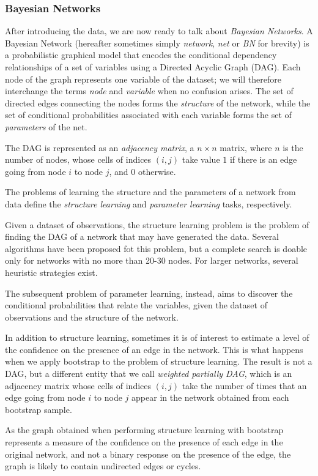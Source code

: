 \documentclass{article}\usepackage[]{graphicx}\usepackage[]{color}
\begin{document}
\subsubsection{Bayesian Networks}
After introducing the data, we are now ready to talk about \emph{Bayesian Networks}. A Bayesian Network
(hereafter sometimes simply \emph{network}, \emph{net} or \emph{BN} for brevity) is a probabilistic graphical model that encodes
the conditional dependency relationships of a set of variables using a Directed Acyclic Graph (DAG).
Each node of the graph represents one variable of the dataset; we will therefore interchange
the terms \emph{node} and \emph{variable} when no confusion arises. The set of directed edges
connecting the nodes forms the \emph{structure} of the network, while the set of conditional
probabilities associated with each variable forms the set of \emph{parameters} of the net.

The DAG is represented as an \textit{adjacency matrix}, a $n\times n$ matrix, where $n$ is the number of nodes,
whose cells of indices $(i,j)$ take value $1$ if there is an edge going from node $i$ to node $j$,
and $0$ otherwise.

The problems of learning the structure and the parameters of a network from data define the
\emph{structure learning} and \emph{parameter learning} tasks, respectively. 

Given a dataset of observations, the structure learning problem is the problem of finding the DAG of a
network that may have generated the data. Several algorithms have been proposed fot this problem, but
a complete search is doable only for networks with no more than 20-30 nodes. For larger networks, several
heuristic strategies exist.

The subsequent problem of parameter learning, instead, aims to discover the conditional probabilities
that relate the variables, given the dataset of observations and the structure of the network.

In addition to structure learning, sometimes it is of interest to estimate a level of the confidence 
on the presence of an edge in the network. This is what happens when we apply bootstrap to the problem
of structure learning. The result is not a DAG, but a different entity that we call \emph{weighted partially DAG},
which is an adjacency matrix whose cells of indices $(i,j)$ take the number of times that an edge going from node $i$
to node $j$ appear in the network obtained from each bootstrap sample.

As the graph obtained when performing structure learning with bootstrap represents a measure of the confidence
on the presence of each edge in the original network, and not a binary response on the presence of the edge,
the graph is likely to contain undirected edges or cycles.
\end{document}
